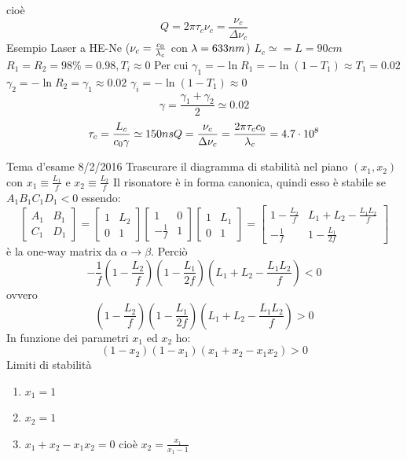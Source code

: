 cioè 
\begin{equation*}
Q = 2\pi \tau_c \nu_c = \frac{\nu_c}{\Delta \nu_c}
\end{equation*}
Esempio
Laser a HE-Ne ($\nu_c = \frac{c_0}{\lambda_c}$ con $\lambda = 633 nm$) $L_c \simeq = L = 90cm$ $R_1 = R_2 = 98\% = 0.98, T_i \approx 0$ Per cui
$\gamma_1 = -\ln R_1 = -\ln (1-T_1) \approx T_1 = 0.02$ $\gamma_2 = -\ln R_2 = \gamma_1 \approx 0.02$ $\gamma_i = -\ln (1-T_1) \approx 0$
\begin{equation}
\gamma = \frac{\gamma_1 + \gamma_2}{2} \simeq 0.02
\end{equation}
\begin{equation*}
\tau_c = \frac{L_c}{c_0\gamma} \simeq 150 ns
Q = \frac{\nu_c}{\Delta \nu_c} = \frac{2\pi \tau_c c_0}{\lambda_c} = 4.7 \cdot 10^8
\end{equation*}

Tema d'esame 8/2/2016
Trascurare il diagramma di stabilità nel piano $(x_1, x_2)$ con $x_1 \equiv \frac{L_1}{f}$ e $x_2 \equiv \frac{L_2}{f}$
Il risonatore è in forma canonica, quindi esso è stabile se $A_1B_1C_1D_1 < 0$ essendo:
\begin{equation*}
\begin{bmatrix}
A_1	&	B_1\\
C_1	&	D_1
\end{bmatrix}
=\begin{bmatrix}
1	&	L_2\\
0	&	1
\end{bmatrix}\begin{bmatrix}
1	&	0\\
-\frac{1}{f}	&	1
\end{bmatrix}\begin{bmatrix}
1	&	L_1\\
0	&	1
\end{bmatrix}=\begin{bmatrix}
1-\frac{L_2}{f}	&	L_1+L_2-\frac{L_1L_2}{f}\\
-\frac{1}{f}	&	1-\frac{L_1}{2f}
\end{bmatrix}
\end{equation*}
è la one-way matrix da $\alpha \rightarrow \beta$. Perciò
\begin{equation*}
-\frac{1}{f} (1-\frac{L_2}{f})(1-\frac{L_1}{2f})(L_1+L_2-\frac{L_1L_2}{f}) < 0
\end{equation*}
ovvero
\begin{equation*}
(1-\frac{L_2}{f})(1-\frac{L_1}{2f})(L_1+L_2-\frac{L_1L_2}{f}) > 0
\end{equation*}
In funzione dei parametri $x_1$ ed $x_2$ ho:
\begin{equation*}
(1-x_2)(1-x_1)(x_1+x_2-x_1x_2) > 0
\end{equation*}
Limiti di stabilità
\begin{enumerate}
\item $x_1 = 1$
\item $x_2 = 1$
\item $x_1 + x_2 - x_1x_2 = 0$ cioè $x_2 = \frac{x_1}{x_1 - 1}$
\end{enumerate}

